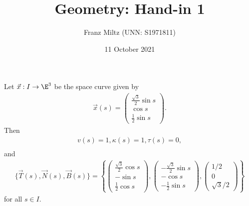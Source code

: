 \documentclass{article}
\begin{document}
\title{Geometry: Hand-in 1}
\author{Franz Miltz (UNN: S1971811)}
\date{11 October 2021}
\maketitle

\begin{claim*}[Question 1]
   Let $\vec x: I\to \E^3$ be the space curve given by
   \begin{align*}
      \vec x(s) = \begin{pmatrix}
         \frac{\sqrt{3}}{2}\sin s \\
         \cos s                   \\
         \frac{1}{2}\sin s
      \end{pmatrix}.
   \end{align*}
   Then
   \begin{align*}
      v(s) = 1, \kappa(s) = 1, \tau(s) = 0, \\
   \end{align*}
   and
   \begin{align*}
      \{\vec T(s), \vec N(s), \vec B(s)\} =
      \left\lbrace  \begin{pmatrix}
         \frac{\sqrt{3}}{2}\cos s \\
         - \sin s                 \\
         \frac{1}{2}\cos s
      \end{pmatrix}, \begin{pmatrix}
         -\frac{\sqrt{3}}{2}\sin s \\
         - \cos s                  \\
         -\frac{1}{2}\sin s
      \end{pmatrix}, \begin{pmatrix}
         1/2 \\ 0 \\ \sqrt{3}/2
      \end{pmatrix}
      \right\rbrace
   \end{align*}
   for all $s\in I$.
\end{claim*}
\end{document}
